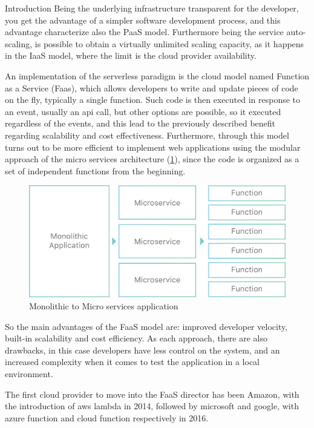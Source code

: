 \begin{chapter}{Introduction}
    Being the underlying infrastructure transparent for the developer, you get the advantage
    of a simpler software development process, and this advantage characterize also
    the PaaS model. Furthermore being the service auto-scaling, is possible to obtain
    a virtually unlimited scaling capacity, as it happens in the IaaS model, where the
    limit is the cloud provider availability.

    An implementation of the serverless paradigm is the cloud model named Function
    as a Service (Faas), which allows developers to write and update pieces of code
    on the fly, typically a single function.
    Such code is then executed in response to an event, usually an api call, but other
    options are possible, so it executed regardless of the events, and this lead to
    the previously described benefit regarding scalability and cost effectiveness.
    Furthermore, through this model turns out to be more efficient to implement web
    applications using the modular approach of the micro services architecture
    (\ref{fig:monolithic_to_microservices}), since the code is organized as a set of
    independent functions from the beginning.

    \begin{figure}
        \centering
        \includegraphics[width=\linewidth]{source/images/monolithic-application-microservice-faas.png}
        \caption{Monolithic to Micro services application}
        \label{fig:monolithic_to_microservices}
    \end{figure}

    So the main advantages of the FaaS model are: improved developer velocity,
    built-in scalability and cost efficiency. As each approach, there are also drawbacks, in
    this case developers have less control on the system, and an increased complexity when it
    comes to test the application in a local environment.

    The first cloud provider to move into the FaaS director has been Amazon, with the
    introduction of aws lambda in 2014, followed by microsoft and google, with
    azure function and cloud function respectively in 2016.


\end{chapter}
